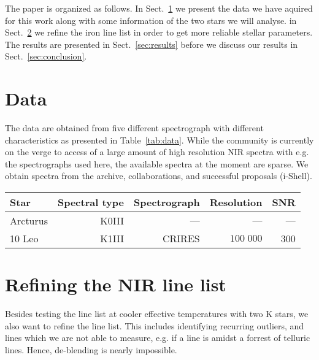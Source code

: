 \documentclass{aa}
\begin{document}
The paper is organized as follows. In Sect.~\ref{sec:data} we present the data
we have aquired for this work along with some information of the two stars we
will analyse. in Sect.~\ref{sec:refining_the_line_list} we refine the iron line
list in order to get more reliable stellar parameters. The results are presented
in Sect.~\ref{sec:results} before we discuss our results in
Sect.~\ref{sec:conclusion}.




\section{Data}
\label{sec:data}

The data are obtained from five different spectrograph with different
characteristics as presented in Table~\ref{tab:data}. While the community is
currently on the verge to access of a large amount of high resolution NIR
spectra with e.g. the spectrographs used here, the available spectra at the
moment are sparse. We obtain spectra from the archive, collaborations, and
successful proposals (i-Shell).



\begin{table*}[htb!]
    \caption{The spectra and spectral type (from Simbad) of our sample with
             the corresponding spectrograph used to acquire the data and its
             spectra resolution. In the last column we show the SNR measured
             with splot in IRAF.}
\label{tab:data}
    \centering
    \begin{tabular}{lrrrr}
      \hline\hline
        Star      & Spectral type & Spectrograph  & Resolution   &  SNR  \\
      \hline
        Arcturus  &      K0III    &  ---          &    ---       &  ---  \\
        10 Leo    &      K1III    & CRIRES        &  $100\;000$  &  300
    \end{tabular}
\end{table*}




\section{Refining the NIR line list}
\label{sec:refining_the_line_list}

Besides testing the line list at cooler effective temperatures with two K stars,
we also want to refine the line list. This includes identifying recurring
outliers, and lines which we are not able to measure, e.g. if a line is amidst a
forrest of telluric lines. Hence, de-blending is nearly impossible.
\end{document}
